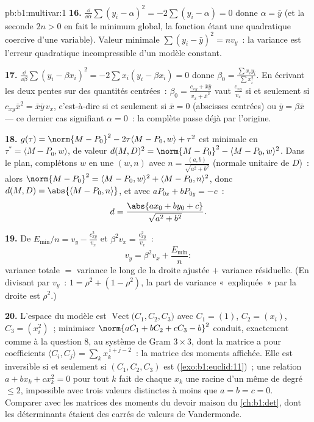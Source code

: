 \begin{solution}{pb:b1:multivar:1}
\textbf{16.} $\frac{\dd}{\dd\alpha}\sum(y_i - \alpha)^2 =
-2\sum(y_i - \alpha) = 0$ donne $\alpha = \bar y$ (et la 
seconde $2n > 0$ en fait le minimum global, la fonction étant une
quadratique coercive d'une variable). Valeur minimale
$\sum(y_i - \bar y)^2 = n v_y$~: la variance est l'erreur
quadratique incompressible d'un modèle constant.

\textbf{17.} $\frac{\dd}{\dd\beta}\sum(y_i - \beta x_i)^2 =
-2\sum x_i(y_i - \beta x_i) = 0$ donne $\beta_0 = \frac{\sum
x_iy_i}{\sum x_i^2}$. En écrivant les deux pentes sur des
quantités centrées~: $\beta_0 = \frac{c_{xy} + \bar x\bar y}{v_x +
\bar x^2}$ vaut $\frac{c_{xy}}{v_x}$ si et seulement si
$c_{xy}\bar x^2 = \bar x\bar y\,v_x$, c'est-à-dire si et seulement
si $\bar x = 0$ (abscisses centrées) ou $\bar y = \beta\bar x$ ---
ce dernier cas signifiant $\alpha = 0$~: la 
complète passe déjà par l'origine.

\textbf{18.} $g(\tau) = \norm{M - P_0}^2 - 2\tau\langle M - P_0,
w\rangle + \tau^2$ est minimale en $\tau^* = \langle M - P_0,
w\rangle$, de valeur $d(M,D)^2 = \norm{M - P_0}^2 - \langle M -
P_0, w\rangle^2$. Dans le plan, complétons $w$ en une 
 $(w, n)$ avec $n = \frac{(a, b)}{\sqrt{a^2+b^2}}$
(normale unitaire de $D$)~: alors $\norm{M - P_0}^2 = \langle M -
P_0, w\rangle^2 + \langle M - P_0, n\rangle^2$, donc $d(M, D) =
\abs{\langle M - P_0, n\rangle}$, et avec $aP_{0x} + bP_{0y} =
-c$~:
\[
d = \frac{\abs{a x_0 + b y_0 + c}}{\sqrt{a^2 + b^2}} .
\]

\textbf{19.} De $E_{\min}/n = v_y - \frac{c_{xy}^2}{v_x}$ et
$\beta^2 v_x = \frac{c_{xy}^2}{v_x}$~:
\[
v_y = \beta^2 v_x + \frac{E_{\min}}n :
\]
variance totale $=$ variance le long de la droite ajustée $+$
variance résiduelle. (En divisant par $v_y$~: $1 = \rho^2 + (1 -
\rho^2)$, la part de variance «~expliquée~» par la droite est
$\rho^2$.)

\textbf{20.} L'espace du modèle est
$\operatorname{Vect}\bigl(C_1, C_2, C_3\bigr)$ avec $C_1 = (1)$,
$C_2 = (x_i)$, $C_3 = (x_i^2)$~; minimiser $\norm{aC_1 + bC_2 +
cC_3 - b}^2$ conduit, exactement comme à la question 8, au système
de Gram $3\times3$, dont la matrice a pour coefficients $\langle
C_i, C_j\rangle = \sum_k x_k^{\,i+j-2}$~: la matrice des moments
affichée. Elle est inversible si et seulement si $(C_1, C_2, C_3)$
est  (\cref{exo:b1:euclid:11})~; une relation $a + bx_k +
cx_k^2 = 0$ pour tout $k$ fait de chaque $x_k$ une racine d'un même
 de degré $\leq 2$, impossible avec trois valeurs
distinctes à moins que $a = b = c = 0$. Comparer avec les matrices
des moments du devoir maison du \cref{ch:b1:det}, dont les
déterminants étaient des carrés de valeurs de Vandermonde.


\end{solution}
